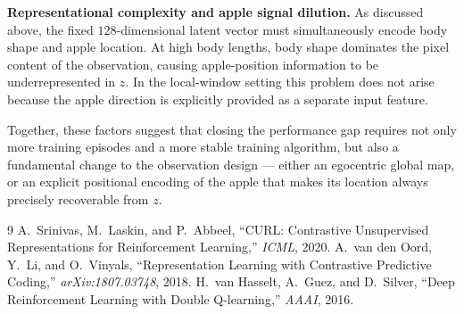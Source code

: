 \documentclass[11pt]{article}
\begin{document}
\textbf{Representational complexity and apple signal dilution.}
As discussed above, the fixed $128$-dimensional latent vector must
simultaneously encode body shape and apple location.
At high body lengths, body shape dominates the pixel content of the
observation, causing apple-position information to be underrepresented in
$z$.
In the local-window setting this problem does not arise because the apple
direction is explicitly provided as a separate input feature.

Together, these factors suggest that closing the performance gap requires
not only more training episodes and a more stable training algorithm, but
also a fundamental change to the observation design — either an egocentric
global map, or an explicit positional encoding of the apple that makes its
location always precisely recoverable from $z$.

\begin{thebibliography}{9}
  A.~Srinivas, M.~Laskin, and P.~Abbeel,
  ``CURL: Contrastive Unsupervised Representations for Reinforcement Learning,''
  \emph{ICML}, 2020.
  A.~van den Oord, Y.~Li, and O.~Vinyals,
  ``Representation Learning with Contrastive Predictive Coding,''
  \emph{arXiv:1807.03748}, 2018.
  H.~van Hasselt, A.~Guez, and D.~Silver,
  ``Deep Reinforcement Learning with Double Q-learning,''
  \emph{AAAI}, 2016.
\end{thebibliography}
\end{document}

